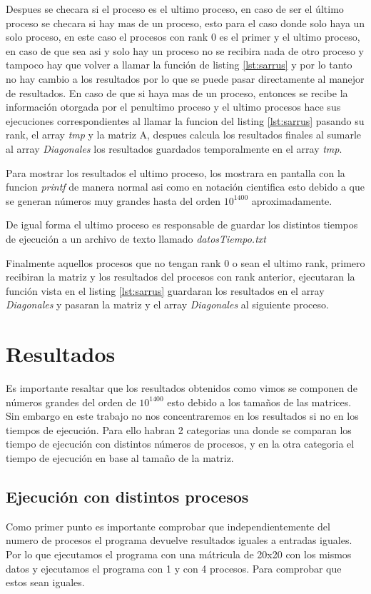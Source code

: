 \documentclass[10pt]{IEEEtran}
\begin{document}
Despues se checara si el proceso es el ultimo proceso, en caso de ser el último proceso se checara si hay mas de un proceso, esto para el caso donde solo haya un solo proceso, en este caso el procesos con rank 0 es el primer y el ultimo proceso, en caso de que sea asi y solo hay un proceso no se recibira nada de otro proceso y tampoco hay que volver a llamar la función de listing \ref{lst:sarrus} y por lo tanto no hay cambio a los resultados por lo que se puede pasar directamente al manejor de resultados. En caso de que si haya mas de un proceso, entonces se recibe la información otorgada por el penultimo proceso y el ultimo procesos hace sus ejecuciones correspondientes al llamar la funcion del listing \ref{lst:sarrus} pasando su rank, el array \textit{tmp} y la matriz A, despues calcula los resultados finales al sumarle al array \textit{Diagonales} los resultados guardados temporalmente en el array \textit{tmp}.

Para mostrar los resultados el ultimo proceso, los mostrara en pantalla con la funcion \textit{printf} de manera normal asi como en notación cientifica esto debido a que se generan números muy grandes hasta del orden $10^{1400}$ aproximadamente.

De igual forma el ultimo proceso es responsable de guardar los distintos tiempos de ejecución a un archivo de texto llamado \textit{datosTiempo.txt}

Finalmente aquellos procesos que no tengan rank $0$ o sean el ultimo rank, primero recibiran la matriz y los resultados del procesos con rank anterior, ejecutaran la función vista en el listing \ref{lst:sarrus} guardaran los resultados en el array \textit{Diagonales} y pasaran la matriz y el array \textit{Diagonales} al siguiente proceso.

\section{Resultados}
Es importante resaltar que los resultados obtenidos como vimos se componen de números grandes del orden de $10^{1400}$ esto debido a los tamaños de las matrices. Sin embargo en este trabajo no nos concentraremos en los resultados si no en los tiempos de ejecución. Para ello habran 2 categorias una donde se comparan los tiempo de ejecución con distintos números de procesos, y en la otra categoria el tiempo de ejecución en base al tamaño de la matriz.

\subsection{Ejecución con distintos procesos}
Como primer punto es importante comprobar que independientemente del numero de procesos el programa devuelve resultados iguales a entradas iguales. Por lo que ejecutamos el programa con una mátricula de 20x20 con los mismos datos y ejecutamos el programa con 1 y con 4 procesos. Para comprobar que estos sean iguales.
\end{document}
